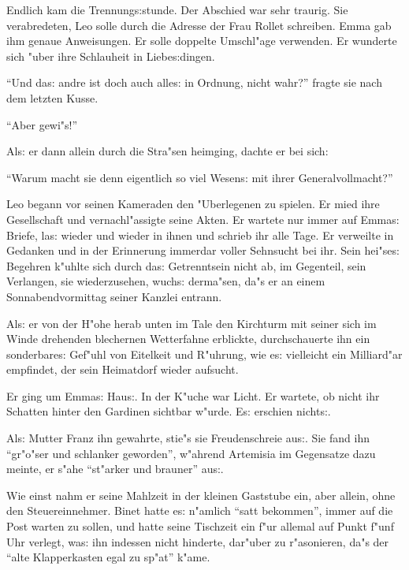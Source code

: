 \documentclass[oneside,12pt]{book}
\newcommand{\s}{s:}%
\begin{document}
Endlich kam die Trennung{\s}stunde. Der Abschied war sehr traurig.
Sie verabredeten, Leo solle durch die Adresse der Frau Rollet
schreiben. Emma gab ihm genaue Anweisungen. Er solle doppelte
Umschl"age verwenden. Er wunderte sich "uber ihre Schlauheit in
Liebe{\s}dingen.

"`Und da{\s} andre ist doch auch alle{\s} in Ordnung, nicht
wahr?"' fragte sie nach dem letzten Kusse.

"`Aber gewi"s!"'

Al{\s} er dann allein durch die Stra"sen heimging, dachte er bei
sich:

"`Warum macht sie denn eigentlich so viel Wesen{\s} mit ihrer
Generalvollmacht?"'


\newpage\begin{center}
{\large \so{Vierte{\s} Kapitel}}\bigskip\bigskip
\end{center}

Leo begann vor seinen Kameraden den "Uberlegenen zu spielen. Er
mied ihre Gesellschaft und vernachl"assigte seine Akten. Er
wartete nur immer auf Emma{\s} Briefe, la{\s} wieder und wieder in
ihnen und schrieb ihr alle Tage. Er verweilte in Gedanken und in
der Erinnerung immerdar voller Sehnsucht bei ihr. Sein hei"se{\s}
Begehren k"uhlte sich durch da{\s} Getrenntsein nicht ab, im
Gegenteil, sein Verlangen, sie wiederzusehen, wuch{\s} derma"sen,
da"s er an einem Sonnabendvormittag seiner Kanzlei entrann.

Al{\s} er von der H"ohe herab unten im Tale den Kirchturm mit
seiner sich im Winde drehenden blechernen Wetterfahne erblickte,
durchschauerte ihn ein sonderbare{\s} Gef"uhl von Eitelkeit und
R"uhrung, wie e{\s} vielleicht ein Milliard"ar empfindet, der sein
Heimatdorf wieder aufsucht.

Er ging um Emma{\s} Hau{\s}. In der K"uche war Licht. Er wartete,
ob nicht ihr Schatten hinter den Gardinen sichtbar w"urde. E{\s}
erschien nicht{\s}.

Al{\s} Mutter Franz ihn gewahrte, stie"s sie Freudenschreie
au{\s}. Sie fand ihn "`gr"o"ser und schlanker geworden"', w"ahrend
Artemisia im Gegensatze dazu meinte, er s"ahe "`st"arker und
brauner"' au{\s}.

Wie einst nahm er seine Mahlzeit in der kleinen Gaststube ein,
aber allein, ohne den Steuereinnehmer. Binet hatte e{\s} n"amlich
"`satt bekommen"', immer auf die Post warten zu sollen, und hatte
seine Tischzeit ein f"ur allemal auf Punkt f"unf Uhr verlegt,
wa{\s} ihn indessen nicht hinderte, dar"uber zu r"asonieren, da"s
der "`alte Klapperkasten egal zu sp"at"' k"ame.
\end{document}

